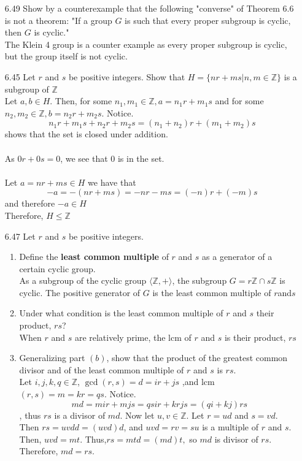 \documentclass[12pt]{article}
\newcommand{\Z}{\mathds{Z}}
\begin{document}
\begin{enumerate}
	\item[6.49] Show by a counterexample that the following "converse" of Theorem 6.6 is not a theorem: "If a group $G$ is such that every proper subgroup is cyclic, then $G$ is cyclic."\\
	The Klein 4 group is a counter example as every proper subgroup is cyclic, but the group itself is not cyclic.
	\item[6.45] Let $r$ and $s$ be positive integers. Show that $H=\{nr+ms|n,m \in \Z \}$ is a subgroup of $\Z$\\
		Let $ a,b \in H $. Then, for some $n_1,m_1 \in \Z, a = n_1r+m_1s $ and  for some $n_2,m_2 \in \Z, b = n_2r+m_2s $. Notice. 
		\[n_1r+m_1s+n_2r+m_2s=(n_1+n_2)r+(m_1+m_2)s\]
		shows that the set is closed under addition.\\
		\\
		As $ 0r+0s=0 $, we see that 0 is in the set.\\
		\\
		Let $ a = nr+ms \in H$ we have that \[-a=-(nr+ms)=-nr-ms=(-n)r+(-m)s\]
		and therefore $ -a\in H $\\
		Therefore, $ H \leq \Z $
	\item[6.47] Let $r$ and $s$ be positive integers.
	\begin{enumerate}
		\item Define the \textbf{least common multiple} of $r$ and $s$ as a generator of a certain cyclic group.\\
		As a subgroup of the cyclic group $ \langle\Z, +\rangle$, the subgroup $G = r\Z \cap s\Z$ is cyclic. The positive generator of $ G $ is the least common multiple of $ r  $and$  s $
		\item Under what condition is the least common multiple of $r$ and $s$ their product, $rs$?\\
		When $ r $ and $ s $ are relatively prime, the lcm of $ r $ and $ s $ is their product, $ rs $ 
		\item Generalizing part $(b)$, show that the product of the greatest common divisor and of the least common multiple of $r$ and $s$ is $rs$.\\
		
		 Let $ i,j,k,q\in\Z $, $ \gcd(r,s) = d = ir + js $ ,and lcm$(r,s) = m = kr = qs$. Notice.
		 \[md = mir + mjs = qsir + krjs = (qi + kj)rs\], thus $ rs $ is a divisor of $ md $. Now let $ u,v\in\Z$. Let $ r = ud $
		and $  s = vd$. Then $ rs = uvdd = (uvd)d $, and $ uvd = rv = su $ is a multiple of $ r $ and $ s $. Then,  $ uvd = mt $. Thus,$  rs = mtd = (md)t, $ so $ md $ is divisor of $ rs $. Therefore, $ md = rs.$
		

\end{enumerate}
\end{enumerate}
\end{document}
